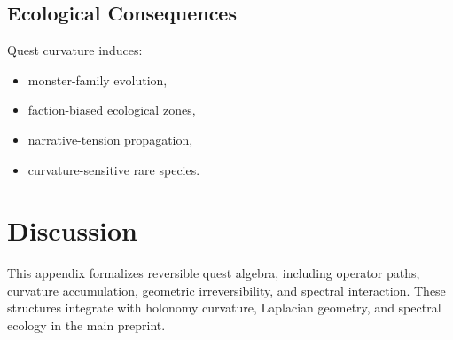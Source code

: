 \subsection{Ecological Consequences}
Quest curvature induces:
\begin{itemize}
    \item monster-family evolution,
    \item faction-biased ecological zones,
    \item narrative-tension propagation,
    \item curvature-sensitive rare species.
\end{itemize}

\section{Discussion}
This appendix formalizes reversible quest algebra, including operator
paths, curvature accumulation, geometric irreversibility, and spectral
interaction. These structures integrate with holonomy curvature,
Laplacian geometry, and spectral ecology in the main preprint.

